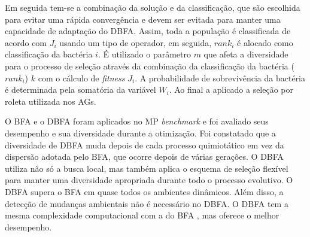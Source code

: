Em seguida tem-se a combinação da solução e da classificação, que são escolhida para evitar uma rápida convergência e devem ser evitada para manter uma capacidade de adaptação do DBFA. Assim, toda a população é classificada de acordo com $J_i$ usando um tipo de operador, em seguida, $rank_i$ é alocado como classificação da bactéria $i$. É utilizado o parâmetro $m$ que afeta a diversidade para o processo de seleção através da combinação da classificação da bactéria ($rank_i$) $k$ com o cálculo de \textit{fitness} $J_i$. A probabilidade de sobrevivência da bactéria é determinada pela somatória da variável $W_i$. Ao final a aplicado a seleção por roleta utilizada nos AGs.

O BFA e o DBFA foram aplicados no MP \textit{benchmark} e foi avaliado seus desempenho e sua diversidade durante a otimização. Foi constatado que a diversidade de DBFA muda depois de cada processo quimiotático em vez da dispersão adotada pelo BFA, que ocorre depois de várias gerações. O DBFA utiliza não só a busca local, mas também aplica o esquema de seleção flexível para manter uma diversidade apropriada durante todo o processo evolutivo. O DBFA supera o BFA em quase todos os ambientes dinâmicos. Além disso, a detecção de mudanças ambientais não é necessário no DBFA. O DBFA tem a mesma complexidade computacional com a do BFA , mas oferece o melhor desempenho.